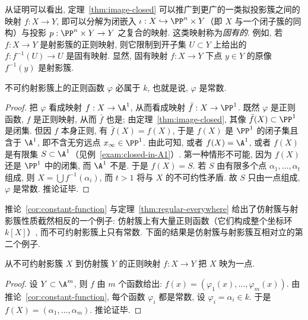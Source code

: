\begin{remark}[固有映射]\label{rem:proper}
	从证明可以看出, 定理~\ref{thm:image-closed} 可以推广到更广的一类拟投影簇之间的映射 $f: X \to Y$, 即可以分解为闭嵌入 $\iota: X \hookrightarrow \PP^n \times Y$（即 $X$ 与一个闭子簇的同构）与投影 $p: \PP^n \times Y \to Y$ 之复合的映射. 这类映射称为\emph{固有的}. 例如, 若 $f: X \to Y$ 是射影簇的正则映射, 则它限制到开子集 $U \subset Y$ 上给出的 $f: f^{-1}(U) \to U$ 是固有映射. 显然, 固有映射 $f: X \to Y$ 下点 $y \in Y$ 的原像 $f^{-1}(y)$ 是射影簇.
\end{remark}

\begin{corollary}\label{cor:constant-function}
	不可约射影簇上的正则函数 $\varphi$ 必属于 $k$, 也就是说, $\varphi$ 是常数.
\end{corollary}

\begin{proof}
	把 $\varphi$ 看成映射 $f: X \to \A^1$, 从而看成映射 $\bar f: X \to \PP^1$. 既然 $\varphi$ 是正则函数, $f$ 是正则映射, 从而 $\bar f$ 也是; 由定理~\ref{thm:image-closed}, 其像 $\bar f(X) \subset \PP^1$ 是闭集. 但因 $f$ 本身正则, 有 $\bar f(X) = f(X)$, 于是 $f(X)$ 是 $\PP^1$ 的闭子集且含于 $\A^1$, 即不含无穷远点 $x_\infty \in \PP^1$. 由此可知, 或者 $f(X) = \A^1$, 或者 $f(X)$ 是有限集 $S \subset \A^1$（见例~\ref{exam:closed-in-A1}）. 第一种情形不可能, 因为 $f(X)$ 还是 $\PP^1$ 中的闭集, 而 $\A^1$ 不是. 于是 $f(X) = S$. 若 $S$ 由有限多个点 $\alpha_1, \ldots, \alpha_t$ 组成, 则 $X = \bigcup f^{-1}(\alpha_i)$, 而 $t > 1$ 将与 $X$ 的不可约性矛盾. 故 $S$ 只由一点组成, $\varphi$ 是常数. 推论证毕.
\end{proof}

推论~\ref{cor:constant-function} 与定理~\ref{thm:regular-everywhere} 给出了仿射簇与射影簇性质截然相反的一个例子: 仿射簇上有大量正则函数（它们构成整个坐标环 $k[X]$）, 而不可约射影簇上只有常数. 下面的结果是仿射簇与射影簇互相对立的第二个例子.

\begin{corollary}\label{cor:projective-to-affine}
	从不可约射影簇 $X$ 到仿射簇 $Y$ 的正则映射 $f: X \to Y$ 把 $X$ 映为一点.
\end{corollary}

\begin{proof}
	设 $Y \subset \A^m$, 则 $f$ 由 $m$ 个函数给出: $f(x) = (\varphi_1(x), \ldots, \varphi_m(x))$. 由推论~\ref{cor:constant-function}, 每个函数 $\varphi_i$ 都是常数, 设 $\varphi_i = \alpha_i \in k$. 于是 $f(X) = (\alpha_1, \ldots, \alpha_m)$. 推论证毕.
\end{proof}

